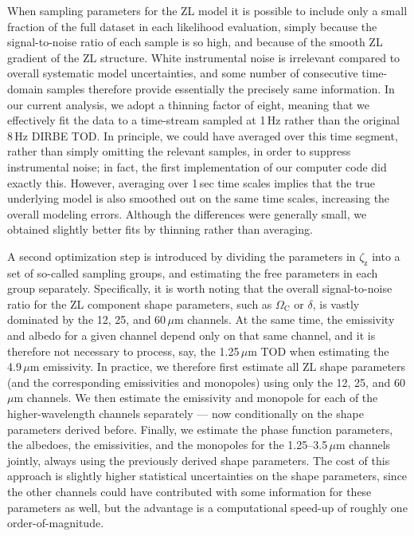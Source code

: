 \documentclass[twocolumn]{aa}
\begin{document}
When sampling parameters for the ZL model it is possible to include only a
small fraction of the full dataset in each likelihood evaluation,
simply because the signal-to-noise ratio of each sample is so high,
and because of the smooth ZL gradient of the ZL
structure. White instrumental noise is
irrelevant compared to overall systematic model uncertainties, and
some number of consecutive time-domain samples therefore provide
essentially the precisely same information. In our current analysis,
we adopt a thinning factor of eight, meaning that we effectively fit
the data to a time-stream sampled at 1\,Hz rather than the original
8\,Hz DIRBE TOD. In principle, we could have averaged over this time
segment, rather than simply omitting the relevant samples, in order to
suppress instrumental noise; in fact, the first implementation of
our computer code did exactly this. However, averaging over 1\,sec
time scales implies that the true underlying model is also smoothed 
out on the same time scales, increasing the overall modeling
errors. Although the differences were generally small, we obtained
slightly better fits by thinning rather than averaging.


A second optimization step is introduced by dividing the parameters in
$\zeta_{\mathrm{z}}$ into a set of so-called sampling groups, and
estimating the free parameters in each group separately. Specifically,
it is worth noting that the overall signal-to-noise ratio for the ZL
component shape parameters, such as $\Omega_{\mathrm{C}}$ or $\delta$,
is vastly dominated by the 12, 25, and 60\,$\mu$m channels. At the same
time, the emissivity and albedo for a given channel depend only on that
same channel, and it is therefore not necessary to process, say, the
1.25\,$\mu$m TOD when estimating the 4.9\,$\mu$m emissivity. In practice,
we therefore first estimate all ZL shape parameters (and the
corresponding emissivities and monopoles) using only the 
12, 25, and 60\,$\mu$m channels. We then estimate the emissivity
and monopole for each of the higher-wavelength channels separately --- now
conditionally on the shape parameters derived before. Finally, 
we estimate the phase function parameters, the albedoes, the emissivities, and 
the monopoles for the 1.25--3.5\,$\mu$m channels jointly, always using the 
previously derived shape parameters. 
The cost of this approach is slightly higher statistical
uncertainties on the shape parameters, since the other channels could
have contributed with some information for these parameters as well,
but the advantage is a computational speed-up of roughly one
order-of-magnitude.
\end{document}
